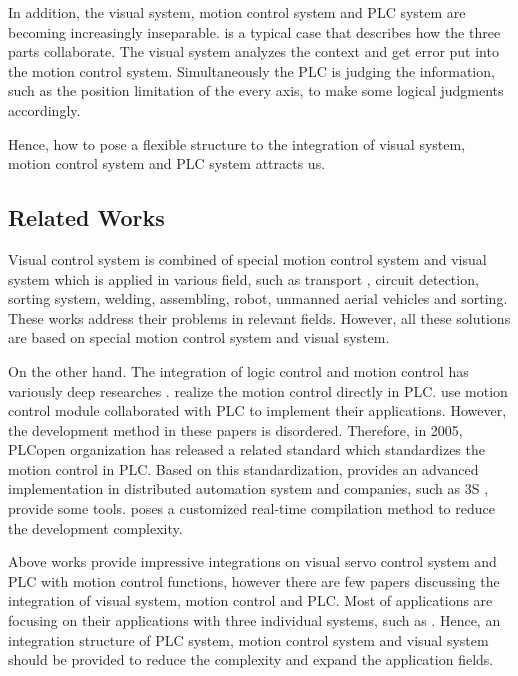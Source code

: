 \documentclass[journal,UTF8]{IEEEtran}
\begin{document}
In addition, the visual system, motion control system and PLC system are becoming increasingly inseparable. \cite{Chen2014A} is a typical case that describes how the three parts collaborate. The visual system analyzes the context and get error put into the motion control system. Simultaneously the PLC is judging the information, such as the position limitation of the every axis, to make some logical judgments accordingly. 

Hence, how to pose a flexible structure to the integration of visual system, motion control system and  PLC system attracts us.





\subsection{Related Works}

Visual control system is combined of special motion control system and visual system which is applied in various field, such as transport \cite{Xing2014Intersection}, circuit detection\cite{Nian2005An}, sorting system, welding\cite{Chen2014A}, assembling\cite{Wang2008Visual,Xiao2014Visual}, robot\cite{Wu2013Cloud,Tsai2017A}, unmanned aerial vehicles\cite{Guenard2010A,Serra2016Landing} and sorting\cite{Sun2013Automatic}. These works address their problems in relevant fields. However, all these solutions are based on special motion control system and visual system.

On the other hand. The integration of logic control and motion control has variously deep researches \cite{Ioannides2004Design,Shi2016The,Fang2017Design, syaichu2011model}. \cite{Ioannides2004Design,syaichu2011model} realize the motion control directly in PLC. \cite{Peng2011Linear, Qian2014A, OMRON2006CS1W} use motion control module collaborated with PLC to implement their applications. However, the development method in these papers is disordered. Therefore, in 2005, PLCopen organization has released a related standard \cite{PLCopen2005Function} which standardizes the motion control in PLC. Based on this standardization, \cite{S2006Advanced} provides an advanced implementation in distributed automation system and companies, such as 3S \cite{3S2017Logic}, provide some tools. \cite{wu2018customized} poses a customized real-time compilation method to reduce the development complexity.

Above works provide impressive integrations on visual servo control system and PLC with motion control functions, however there are few papers discussing the integration of visual system, motion control and PLC. Most of applications are focusing on their applications with three individual systems, such as \cite{Chen2014A}. Hence, an integration structure of PLC system, motion control system and visual system should be provided to reduce the complexity and expand the application fields.
\end{document}
